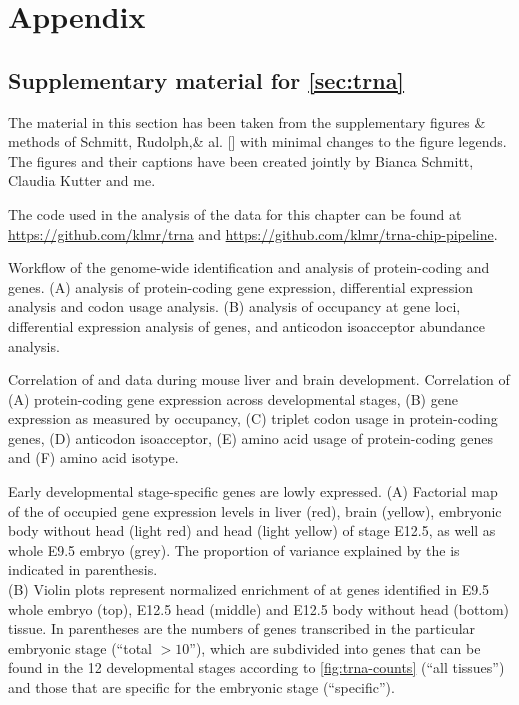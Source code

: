 \clearpage
{}
{}
\part*{Appendix}
\label{sec:appendix}

\setcounter{chapter}{0}
\renewcommand\thechapter{\Alph{chapter}}

\chapter{Supplementary material for \texorpdfstring{\cref*{sec:trna}}{chapter 2}}

The material in this section has been taken from the supplementary figures \&
methods of Schmitt, Rudolph,\andothersdelim\& al. [\cite*{Schmitt:2014}] with
minimal changes to the figure legends. The figures and their captions have been
created jointly by Bianca Schmitt, Claudia Kutter and me.

The code used in the analysis of the data for this chapter can be found at
\url{https://github.com/klmr/trna} and
\url{https://github.com/klmr/trna-chip-pipeline}.

\begingroup
\renewcommand*\floatpos{H}

    {Workflow of the genome-wide identification and analysis of protein-coding
    and \trna genes.}
    {(A) \rnaseq analysis of protein-coding gene expression, differential
    expression analysis and codon usage analysis. (B) \chipseq analysis of 
    occupancy at \trna gene loci, differential expression analysis of \trna
    genes, and anticodon isoacceptor abundance analysis.}

    {Correlation of \rnaseq and  \chipseq data during mouse liver and brain
    development.}
    {Correlation of (A) protein-coding gene expression across developmental
    stages, (B) \trna gene expression as measured by  occupancy, (C)
    triplet codon usage in protein-coding genes, (D) \trna anticodon
    isoacceptor, (E) amino acid usage of protein-coding genes and (F) \trna
    amino acid isotype.}

    {Early developmental stage-specific \trna genes are lowly expressed.}
    {(A) Factorial map of the \pca of  occupied \trna gene expression
    levels in liver (red), brain (yellow), embryonic body without head (light
    red) and head (light yellow) of stage E12.5, as well as whole E9.5 embryo
    (grey). The proportion of variance explained by the  is indicated
    in parenthesis.\\
    (B) Violin plots represent normalized enrichment of  at \trna genes
    identified in E9.5 whole embryo (top), E12.5 head (middle) and E12.5 body
    without head (bottom) tissue. In parentheses are the numbers of \trna genes
    transcribed in the particular embryonic stage (“total \(>10\)”), which are
    subdivided into \trna genes that can be found in the \num{12} developmental
    stages according to \cref{fig:trna-counts} (“all tissues”) and those that
    are specific for the embryonic stage (“specific”).}

